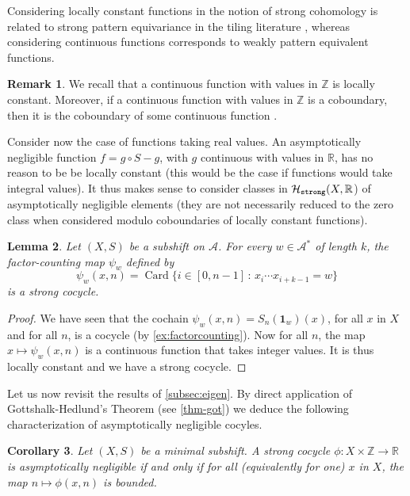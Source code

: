 \documentclass{article}
\newtheorem{lemma}{Lemma}%
\newtheorem{corollary}[lemma]{Corollary}
\theoremstyle{definition}
\newtheorem{remark}[lemma]{Remark}
\newcommand{\R}{\mathbb{R}}
\newcommand{\cH}{\mathcal{H}}
\DeclareMathOperator{\Card}{Card}
\begin{document}
Considering locally constant functions in the  notion of  strong cohomology  is related to  strong pattern equivariance in the tiling literature \cite{Sadun:16}, whereas   considering  continuous functions corresponds to   weakly pattern equivalent functions.
\begin{remark}
We recall that a  continuous function with values in ${\mathbb Z}$ is locally constant. Moreover, if a  continuous function with values in ${\mathbb Z}$  is a coboundary,  then it is  the coboundary of some continuous function \cite[Proposition 3.1.3]{DuPerrin}. 


Consider now the case of functions taking real values. An   asymptotically  negligible function $f =g\circ S- g$, with $g$ continuous with values in ${\mathbb R}$,     has no reason to be  be locally constant   (this would be the case if
 functions  would   take  integral  values).   It thus makes sense  to consider  classes   in $\cH_{\tt{strong}}(X,{\mathbb R}$) of  asymptotically negligible elements (they are not    necessarily   reduced to the 
 zero class  when considered modulo coboundaries of   locally constant functions). 
 \end{remark}


\begin{lemma}  \label{lem:factorcounting} Let $(X,S)$ be  a  subshift on ${\mathcal A}$.  
For every $w \in  {\mathcal A}^*$ of length $k$, 
the  factor-counting map $\psi_w$ defined by
\begin{equation}\label{eq-cocycle-base2}
 \psi_w (x,n) = \Card \bigl\{ i \in [0, n-1]  \,: \,  x_i \cdots x_{i+k-1} = w\bigr\}
\end{equation}
 is a strong cocycle.
\end{lemma}
\begin{proof} We have seen  that  the cochain $ \psi_w (x,n) =S_n ({\mathbf 1}_w) (x)$, for all  $x$ in $X$  and  for all $n$, is a cocycle (by \cref{ex:factorcounting}).
Now for all $n$,  the map $ x \mapsto \psi_w (x,n)$ is a continuous function  that  takes integer values.  It is thus locally constant and  we have a strong cocycle.
\end{proof}



Let us now  revisit the results of \cref{subsec:eigen}.
By direct application of Gottshalk-Hedlund's Theorem  (see \cref{thm-got}) we deduce the following  characterization of  asymptotically negligible cocyles.
\begin{corollary}\label{cor-angh} Let $(X,S)$ be  a minimal  subshift.
 A  strong cocycle  $\phi: X \times \mathbb Z \rightarrow \R$ is asymptotically negligible if and only if for all (equivalently for one) $x$ in $X$, the map $n \mapsto \phi(x,n)$ is bounded.
\end{corollary}
\end{document}
